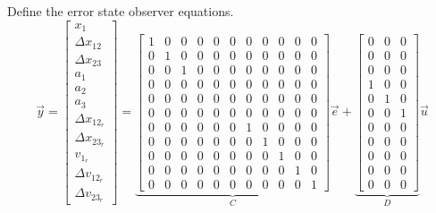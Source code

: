 \documentclass[12pt,onecolumn,reqno]{amsart}
\begin{document}
Define the error state observer equations.
\begin{equation}
  \vec{y} = 
  \begin{bmatrix}
    x_{1}             \\
    \Delta x_{12}     \\
    \Delta x_{23}     \\
    a_{1}             \\
    a_{2}             \\
    a_{3}             \\
    \Delta x_{12_{r}} \\
    \Delta x_{23_{r}} \\
    v_{1_{r}}         \\
    \Delta v_{12_{r}} \\
    \Delta v_{23_{r}}
  \end{bmatrix}
  =
  \underbrace{
  \begin{bmatrix}
    1 & 0 & 0 & 0 & 0 & 0 & 0 & 0 & 0 & 0 & 0 \\
    0 & 1 & 0 & 0 & 0 & 0 & 0 & 0 & 0 & 0 & 0 \\
    0 & 0 & 1 & 0 & 0 & 0 & 0 & 0 & 0 & 0 & 0 \\
    0 & 0 & 0 & 0 & 0 & 0 & 0 & 0 & 0 & 0 & 0 \\
    0 & 0 & 0 & 0 & 0 & 0 & 0 & 0 & 0 & 0 & 0 \\
    0 & 0 & 0 & 0 & 0 & 0 & 0 & 0 & 0 & 0 & 0 \\
    0 & 0 & 0 & 0 & 0 & 0 & 1 & 0 & 0 & 0 & 0 \\
    0 & 0 & 0 & 0 & 0 & 0 & 0 & 1 & 0 & 0 & 0 \\
    0 & 0 & 0 & 0 & 0 & 0 & 0 & 0 & 1 & 0 & 0 \\
    0 & 0 & 0 & 0 & 0 & 0 & 0 & 0 & 0 & 1 & 0 \\
    0 & 0 & 0 & 0 & 0 & 0 & 0 & 0 & 0 & 0 & 1
  \end{bmatrix}
  }_{C}
  \vec{e}
  +
  \underbrace{
  \begin{bmatrix}
    0 & 0 & 0 \\
    0 & 0 & 0 \\
    0 & 0 & 0 \\
    1 & 0 & 0 \\
    0 & 1 & 0 \\
    0 & 0 & 1 \\
    0 & 0 & 0 \\
    0 & 0 & 0 \\
    0 & 0 & 0 \\
    0 & 0 & 0 \\
    0 & 0 & 0 
  \end{bmatrix}
  }_{D}
  \vec{u}
\end{equation}
\end{document}
